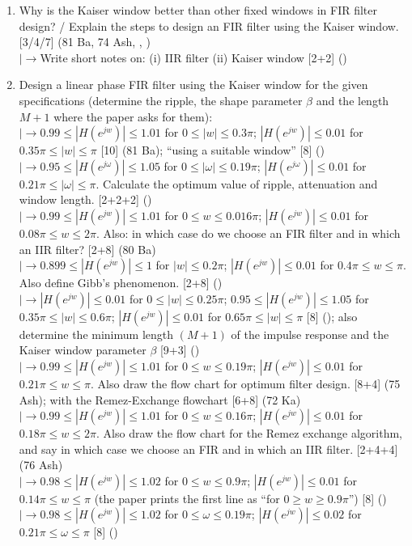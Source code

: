 \documentclass[12pt]{article}
\newcommand{\lb}{\\$\left|\rightarrow\right.$}
\begin{document}
    \begin{enumerate}[topsep=0pt, noitemsep]
      \item Why is the Kaiser window better than other fixed windows in FIR filter design? / Explain the steps to design an FIR filter using the Kaiser window. \hfill [3/4/7] (81 Ba, 74 Ash, , )
        \lb Write short notes on: (i) IIR filter (ii) Kaiser window \hfill [2+2] ()

      \item Design a linear phase FIR filter using the Kaiser window for the given specifications (determine the ripple, the shape parameter $\beta$ and the length $M+1$ where the paper asks for them):
        \lb $0.99\le|H(e^{jw})|\le1.01$ for $0\le|w|\le0.3\pi$; $|H(e^{jw})|\le0.01$ for $0.35\pi\le|w|\le\pi$ \hfill [10] (81 Ba); ``using a suitable window'' \hfill [8] ()
        \lb $0.95\le|H(e^{j\omega})|\le1.05$ for $0\le|\omega|\le0.19\pi$; $|H(e^{j\omega})|\le0.01$ for $0.21\pi\le|\omega|\le\pi$. Calculate the optimum value of ripple, attenuation and window length. \hfill [2+2+2] ()
        \lb $0.99\le|H(e^{jw})|\le1.01$ for $0\le w\le0.016\pi$; $|H(e^{jw})|\le0.01$ for $0.08\pi\le w\le2\pi$. Also: in which case do we choose an FIR filter and in which an IIR filter? \hfill [2+8] (80 Ba)
        \lb $0.899\le|H(e^{jw})|\le1$ for $|w|\le0.2\pi$; $|H(e^{jw})|\le0.01$ for $0.4\pi\le w\le\pi$. Also define Gibb's phenomenon. \hfill [2+8] ()
        \lb $|H(e^{jw})|\le0.01$ for $0\le|w|\le0.25\pi$; $0.95\le|H(e^{jw})|\le1.05$ for $0.35\pi\le|w|\le0.6\pi$; $|H(e^{jw})|\le0.01$ for $0.65\pi\le|w|\le\pi$ \hfill [8] (); also determine the minimum length $(M+1)$ of the impulse response and the Kaiser window parameter $\beta$ \hfill [9+3] ()
        \lb $0.99\le|H(e^{jw})|\le1.01$ for $0\le w\le0.19\pi$; $|H(e^{jw})|\le0.01$ for $0.21\pi\le w\le\pi$. Also draw the flow chart for optimum filter design. \hfill [8+4] (75 Ash); with the Remez-Exchange flowchart \hfill [6+8] (72 Ka)
        \lb $0.99\le|H(e^{jw})|\le1.01$ for $0\le w\le0.16\pi$; $|H(e^{jw})|\le0.01$ for $0.18\pi\le w\le2\pi$. Also draw the flow chart for the Remez exchange algorithm, and say in which case we choose an FIR and in which an IIR filter. \hfill [2+4+4] (76 Ash)
        \lb $0.98\le|H(e^{jw})|\le1.02$ for $0\le w\le0.9\pi$; $|H(e^{jw})|\le0.01$ for $0.14\pi\le w\le\pi$ (the paper prints the first line as ``for $0\ge w\ge0.9\pi$'') \hfill [8] ()
        \lb $0.98\le|H(e^{jw})|\le1.02$ for $0\le\omega\le0.19\pi$; $|H(e^{jw})|\le0.02$ for $0.21\pi\le\omega\le\pi$ \hfill [8] ()

\end{enumerate}
\end{document}
